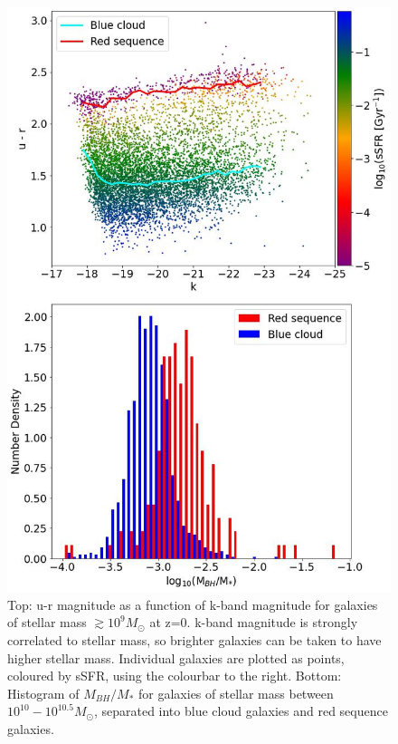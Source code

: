\documentclass[12pt, twocolumn]{report}%
\begin{document}
\begin{figure}[H]
\centering
\includegraphics[width=15cm]{Plot_1.jpeg}
\caption{Top: u-r magnitude as a function of k-band magnitude for galaxies of stellar mass $\gtrsim10^9M_\odot$ at z=0. k-band magnitude is strongly correlated to stellar mass, so brighter galaxies can be taken to have higher stellar mass. Individual galaxies are plotted as points, coloured by sSFR, using the colourbar to the right. Bottom: Histogram of $M_{BH}/M_*$ for galaxies of stellar mass between $10^{10} - 10^{10.5}M_\odot$, separated into blue cloud galaxies and red sequence galaxies.}
\label{fig:2}
\end{figure}
\twocolumngrid
\end{document}
